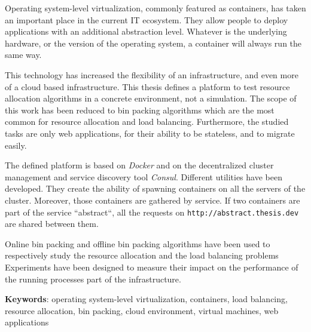 Operating system-level virtualization, commonly featured as containers, has taken an
important place in the current IT ecosystem. They allow people to deploy
applications with an additional abstraction level. Whatever is the underlying
hardware, or the version of the operating system, a container will always run
the same way.

This technology has increased the flexibility of an infrastructure, and even
more of a cloud based infrastructure. This thesis defines a platform to test
resource allocation algorithms in a concrete environment, not a simulation. The
scope of this work has been reduced to bin packing algorithms which are the
most common for resource allocation and load balancing. Furthermore, the
studied tasks are only web applications, for their ability to be stateless, and
to migrate easily.

The defined platform is based on \textit{Docker} and on the decentralized
cluster management and service discovery tool \textit{Consul}. Different
utilities have been developed. They create the ability of spawning containers
on all the servers of the cluster. Moreover, those containers are gathered
by service. If two containers are part of the service ``abstract``, all the
requests on \texttt{http://abstract.thesis.dev} are shared between them.

Online bin packing and offline bin packing algorithms have been used to
respectively study the resource allocation and the load balancing problems
Experiments have been designed to measure their impact on the performance
of the running processes part of the infrastructure.

\vspace{2em}
\textbf{Keywords}: operating system-level virtualization, containers, load
balancing, resource allocation, bin packing, cloud environment, virtual
machines, web applications
